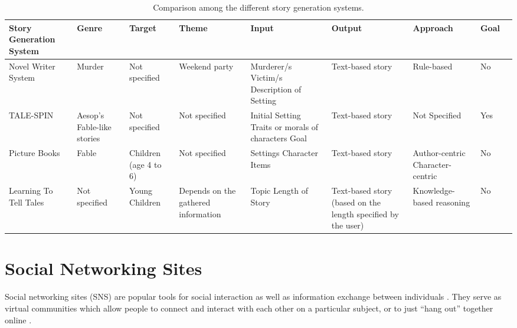\begin{sidewaystable}[ph!]   %
\centering
\caption{Comparison among the different story generation systems.} \vspace{0.25em}
\begin{tabular}{|p{1in}|p{2cm}|p{2cm}|p{2cm}|p{2cm}|p{2cm}|p{2cm}|p{2cm}|p{2cm}|} \hline
\centering Story Generation System & Genre & Target & Theme & Input & Output & Approach & Goal \\ \hline
Novel Writer System & Murder & Not specified & Weekend party & Murderer/s \newline Victim/s \newline Description of Setting & Text-based story & Rule-based & No\\ \hline
TALE-SPIN & Aesop's Fable-like stories & Not specified & Not specified & Initial Setting \newline Traits or morals of characters \newline Goal & Text-based story & Not Specified & Yes \\ \hline
Picture Books & Fable & Children (age 4 to 6) & Not specified & Settings \newline Character \newline Items & Text-based story & Author-centric \newline Character-centric & No \\ \hline
Learning To Tell Tales & Not specified  & Young Children  & Depends on the gathered information & Topic \newline Length of Story & Text-based story (based on the length specified by the user) & Knowledge-based reasoning & No \\ \hline
\end{tabular}
\label{tab:StorytellingSystems}
\end{sidewaystable}
\clearpage

\section{Social Networking Sites}
Social networking sites (SNS) are popular tools for social interaction as well as information exchange between individuals \cite{HughesRoweBateyLee2012}. They serve as virtual communities which allow people to connect and interact with each other on a  particular subject, or to just ``hang out'' together online \cite{CheungChiuLee2011}.

